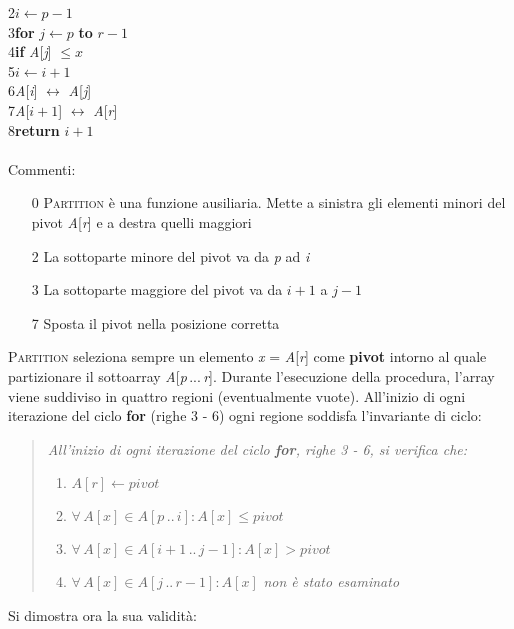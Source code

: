 \documentclass[10pt, a4paper]{report}
\newcommand\firsttab[1][0.5cm]{\hspace*{#1}}
\newcommand\secondtab[1][1cm]{\hspace*{#1}}
\newcommand\thirdtab[1][1.5cm]{\hspace*{#1}}
\begin{document}
2\firsttab$i \leftarrow p - 1$\\
3\firsttab\textbf{for} $j \leftarrow p$ \textbf{to} $r - 1$\\
4\secondtab\textbf{if} \textit{A}[\textit{j}] $\leq x$\\
5\thirdtab$i \leftarrow i + 1$\\
6\thirdtab \textit{A}[\textit{i}] $\leftrightarrow$ \textit{A}[\textit{j}]\\
7\firsttab \textit{A}[$i + 1$] $\leftrightarrow$ \textit{A}[\textit{r}]\\
8\firsttab\textbf{return} $i + 1$\\\\
Commenti:
\begin{enumerate}
\item[0]\textsc{Partition} è una funzione ausiliaria. Mette a sinistra gli elementi minori del pivot \textit{A}[\textit{r}] e a destra quelli maggiori
\item[2]La sottoparte minore del pivot va da \textit{p} ad \textit{i}
\item[3]La sottoparte maggiore del pivot va da $i + 1$ a $j - 1$
\item[7]Sposta il pivot nella posizione corretta
\end{enumerate}
\textsc{Partition} seleziona sempre un elemento \textit{x} = \textit{A}[\textit{r}] come \textbf{pivot} intorno al quale partizionare il sottoarray \textit{A}[\textit{p}\,...\,\textit{r}]. Durante l'esecuzione della procedura, l'array viene suddiviso in quattro regioni (eventualmente vuote). All'inizio di ogni iterazione del ciclo \textbf{for} (righe 3 - 6) ogni regione soddisfa l'invariante di ciclo:
\begin{quote}
\textit{All'inizio di ogni iterazione del ciclo \textbf{for}, righe 3 - 6, si verifica che:}
\begin{enumerate}
\item$A[r] \leftarrow pivot$
\item$\forall\,A[x] \in A[\textit{p}\,..\,\textit{i}] : A[x] \leq pivot$
\item$\forall\,A[x] \in A[\textit{i} + 1\,..\,\textit{j} - 1] : A[x] > pivot$
\item$\forall\,A[x] \in A[\textit{j}\,..\,\textit{r} - 1] : A[x]$ \textit{non è stato esaminato}
\end{enumerate}
\end{quote}
Si dimostra ora la sua validità:
\end{document}
